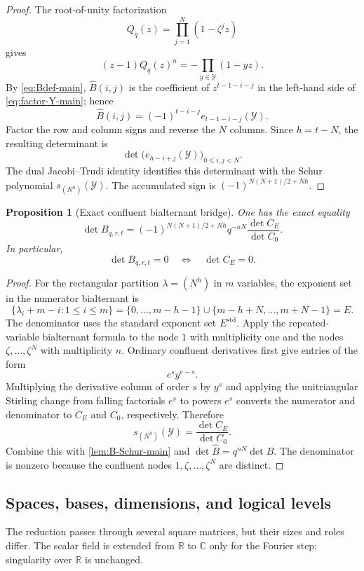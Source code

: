 \documentclass[11pt]{amsart}
\newcommand{\R}{\mathbb R}
\newcommand{\C}{\mathbb C}
\newcommand{\cB}{\widehat B}
\newcommand{\1}{\mathbf 1}
\newtheorem{proposition}[theorem]{Proposition}
\theoremstyle{remark}
\begin{document}
\begin{proof}
The root-of-unity factorization
\[
 Q_q(z)=\prod_{j=1}^{N}(1-\zeta^jz)
\]
gives
\begin{equation}\label{eq:factor-Y-main}
 (z-1)Q_q(z)^n=-\prod_{y\in\mathcal Y}(1-yz).
\end{equation}
By \eqref{eq:Bdef-main}, $\cB(i,j)$ is the coefficient of $z^{t-1-i-j}$ in the left-hand side of \eqref{eq:factor-Y-main}; hence
\[
 \cB(i,j)=(-1)^{t-i-j}e_{t-1-i-j}(\mathcal Y).
\]
Factor the row and column signs and reverse the $N$ columns. Since $h=t-N$, the resulting determinant is
\[
 \det\bigl(e_{h-i+j}(\mathcal Y)\bigr)_{0\le i,j<N}.
\]
The dual Jacobi--Trudi identity identifies this determinant with the Schur polynomial $s_{(N^h)}(\mathcal Y)$. The accumulated sign is $(-1)^{N(N+1)/2+Nh}$.
\end{proof}

\begin{proposition}[Exact confluent bialternant bridge]\label{prop:B-CE-main}
One has the exact equality
\begin{equation}\label{eq:B-CE-main}
 \det B_{q,r,t}
 =(-1)^{N(N+1)/2+Nh}q^{-nN}\frac{\det C_E}{\det C_0}.
\end{equation}
In particular,
\[
 \det B_{q,r,t}=0\quad\Longleftrightarrow\quad\det C_E=0.
\]
\end{proposition}

\begin{proof}
For the rectangular partition $\lambda=(N^h)$ in $m$ variables, the exponent set in the numerator bialternant is
\[
 \{\lambda_i+m-i:1\le i\le m\}
 =\{0,\ldots,m-h-1\}\cup\{m-h+N,\ldots,m+N-1\}=E.
\]
The denominator uses the standard exponent set $E^{\mathrm{std}}$. Apply the repeated-variable bialternant formula to the node $1$ with multiplicity one and the nodes $\zeta,\ldots,\zeta^N$ with multiplicity $n$. Ordinary confluent derivatives first give entries of the form
\[
 e^{\underline{s}}y^{e-s}.
\]
Multiplying the derivative column of order $s$ by $y^s$ and applying the unitriangular Stirling change from falling factorials $e^{\underline{s}}$ to powers $e^s$ converts the numerator and denominator to $C_E$ and $C_0$, respectively. Therefore
\[
 s_{(N^h)}(\mathcal Y)=\frac{\det C_E}{\det C_0}.
\]
Combine this with \cref{lem:B-Schur-main} and $\det\cB=q^{nN}\det B$. The denominator is nonzero because the confluent nodes $1,\zeta,\ldots,\zeta^N$ are distinct.
\end{proof}

\subsection{Spaces, bases, dimensions, and logical levels}
The reduction passes through several square matrices, but their sizes and roles differ. The scalar field is extended from $\R$ to $\C$ only for the Fourier step; singularity over $\R$ is unchanged.
\end{document}
